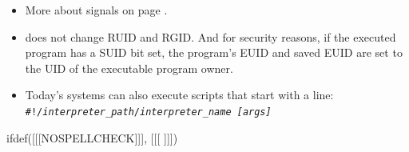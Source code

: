 \begin{itemize}
\item More about signals on page \pageref{SIGNALS}.
\item {} does not change RUID and RGID.  And for security reasons, if
the executed program has a SUID bit set, the program's EUID and saved EUID are
set to the UID of the executable program owner.
\item Today's systems can also execute scripts that start with a line:\\
\texttt{\#!/\emph{interpreter\_path}/\emph{interpreter\_name} \emph{[args]}}
\end{itemize}


ifdef([[[NOSPELLCHECK]]], [[[
]]])

